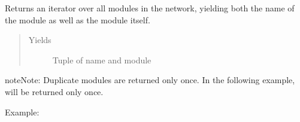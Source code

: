 \documentclass[letterpaper,10pt,english]{sphinxmanual}
\begin{document}
\begin{fulllineitems}
\begin{fulllineitems}
\end{fulllineitems}


\begin{fulllineitems}
\label{\detokenize{api/autoencoding:geology.metamodelling.SpatialAutoencoder.named_modules}}
Returns an iterator over all modules in the network, yielding
both the name of the module as well as the module itself.
\begin{quote}\begin{description}
\item[{Yields}] \leavevmode
{} \textendash{} Tuple of name and module

\end{description}\end{quote}

\begin{sphinxadmonition}{note}{Note:}
Duplicate modules are returned only once. In the following
example,  will be returned only once.
\end{sphinxadmonition}

Example:

\begin{sphinxVerbatim}[commandchars=\\\{\}]
   
   
    

\end{sphinxVerbatim}


\end{fulllineitems}
\end{fulllineitems}
\end{document}
